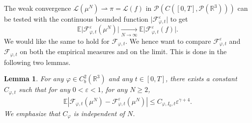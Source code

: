 \documentclass[11pt,a4paper]{article}
\theoremstyle{definition}
\theoremstyle{plain}
\newtheorem{lemma}[defi]{Lemma}
\begin{document}
The weak convergence $\mathcal{L}(\mu^N)\rightharpoonup\pi=\mathcal{L}(f)$ in $\mathcal{P}(C([0,T],\mathcal{P}(\mathbb{R}^3)))$ can be tested with the continuous bounded function $\vert \mathcal{F}^\varepsilon_{\varphi,t}\vert$ to get
$$\mathbb{E}\vert \mathcal{F}^\varepsilon_{\varphi,t}(\mu^N)\vert\xrightarrow[N\rightarrow\infty]{}\mathbb{E}\vert \mathcal{F}^\varepsilon_{\varphi,t}(f)\vert.$$
We would like the same to hold for $\mathcal{F}_{\varphi,t}$. We hence want to compare $\mathcal{F}^\varepsilon_{\varphi,t}$ and $\mathcal{F}_{\varphi,t}$ on both the empirical measures and on the limit. This is done in the following two lemmas.

\begin{lemma}
    \label{aswsolution-feps f empirical measures}
    For any $\varphi\in C^2_b(\mathbb{R}^3)$ and any $t\in[0,T]$, there exists a constant $C_{\varphi,t}$ such that for any $0<\varepsilon<1$, for any $N\geq 2$,
    \begin{align*}
        \mathbb{E} \left\vert\mathcal{F}_{\varphi,t}(\mu^N)-\mathcal{F}^\varepsilon_{\varphi,t}(\mu^N) \right\vert \leq C_{\varphi,I_0,t} \varepsilon^{\gamma+4}.
    \end{align*}
    We emphasize that $ C_\varphi$ is independent of $N$. 
\end{lemma}
\end{document}
